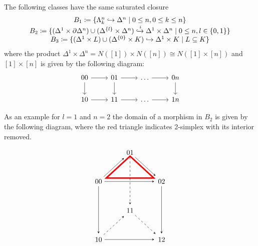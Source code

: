 \begin{prop}
    The following classes have the same saturated closure
     \[
     \begin{tabular}{c}
          $B_1\coloneqq \{\Lambda_k^n \hookrightarrow\Delta^n \mid 0\leq n,0 \leq k \leq n \}$
          \\
          $B_2\coloneqq \{(\Delta^1 \times \partial \Delta^n) \cup(\Delta^{\{l\}} \times \Delta^n) \xhookrightarrow{i} \Delta^1 \times \Delta^n \mid 0 \leq n, l \in \{0,1\}\}$
          \\
          $B_3 \coloneqq
          \{ ( \Delta^1 \times L) \cup(\Delta^{\{0\}} \times K) \hookrightarrow \Delta^1 \times K \mid L \subseteq K \}$
     \end{tabular}
     \]
     where the product $\Delta^1 \times \Delta^n = N ( [1]) \times N([n]) \cong N ( [1] \times [n] )$ and $[1] \times [n] $ is given by the following diagram:
     \[
     \begin{tikzcd}
         00
         \ar[r]
         \ar[d]
         &
         01
         \ar[r]
         \ar[d]
         &
         \dotsc
         \ar[r]
         &
         0n
         \ar[d]
         \\
         10 
         \ar[r]
         &
         11
         \ar[r]
         &
         \dotsc
         \ar[r]
         &
         1n
     \end{tikzcd}
     \]
\end{prop}

As an example for $l=1$ and $n=2$ the domain of a morphism in $B_2$ is given by the following diagram, where the red triangle indicates 2-simplex with its interior removed.
\[
\begin{tikzpicture}[>=stealth,->,shorten >=2pt,looseness=.5,auto]
            \matrix[anchor=center, column sep=1cm, row sep=1cm] at (0,0)
            {
                                & \node(01) {$01$};   &                 \\
             \node(00) {$00$};     &                  & \node(02) {$02$}; \\
                                & \node(11) {$11$};   &                  \\
            \node(10) {$10$};    &                     & \node(12) {$12$}; \\ 
            };
            \draw[line width=2pt,color=red] (-1.2,0.9) -- (1.2,0.9) -- (0, 2) -- cycle;
            \begin{scope}[every node/.style={font=\small\itshape}]
                \draw (00) --  (01);
                \draw (00) --  (02);
                \draw (01) --  (02);
                \draw (00) --  (10);
                \draw [dashed] (01) --  (11);
                \draw (02) --  (12);
                \draw [dashed]  (10) --  (11);
                \draw   (10) --  (12);
                \draw [dashed]   (11) -- (12);
            \end{scope}
    \end{tikzpicture}
\]

